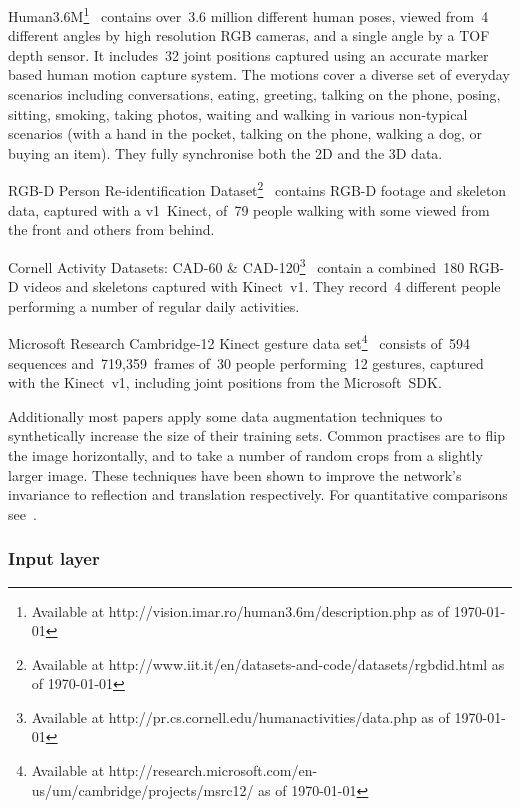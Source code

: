 \documentclass[11pt]{article} %
\begin{document}
Human3.6M\footnote{Available at http://vision.imar.ro/human3.6m/description.php  as of \today}~\cite{Ionescu2014,Ionescu2011} contains over~3.6 million different human poses, viewed from~4 different angles by high resolution RGB cameras, and a single angle by a TOF depth sensor. It includes~32 joint positions captured using an accurate marker based human motion capture system. The motions cover a diverse set of everyday scenarios including conversations, eating, greeting, talking on the phone, posing, sitting, smoking, taking photos, waiting and walking in various non-typical scenarios (with a hand in the pocket, talking on the phone, walking a dog, or buying an item). They fully synchronise both the 2D and the 3D data. 

RGB-D Person Re-identification Dataset\footnote{Available at http://www.iit.it/en/datasets-and-code/datasets/rgbdid.html as of \today}~\cite{Barbosa2012} contains RGB-D footage and skeleton data, captured with a v1~Kinect, of~79 people walking with some viewed from the front and others from behind. 

Cornell Activity Datasets: CAD-60 \& CAD-120\footnote{Available at http://pr.cs.cornell.edu/humanactivities/data.php as of \today}~\cite{Sung2011} contain a combined~180 RGB-D videos and skeletons captured with Kinect~v1. They record~4 different people performing a number of regular daily activities. 

Microsoft Research Cambridge-12 Kinect gesture data set\footnote{Available at http://research.microsoft.com/en-us/um/cambridge/projects/msrc12/ as of \today}~\cite{Fothergill2012} consists of~594 sequences and~719,359~frames of~30 people performing~12 gestures, captured with the Kinect~v1, including joint positions from the Microsoft~SDK.

Additionally most papers apply some data augmentation techniques to synthetically increase the size of their training sets. Common practises are to flip the image horizontally, and to take a number of random crops from a slightly larger image. These techniques have been shown to improve the network's invariance to reflection and translation respectively. For quantitative comparisons see~\cite{Howard2013}.


\subsubsection{Input layer}

\end{document}

